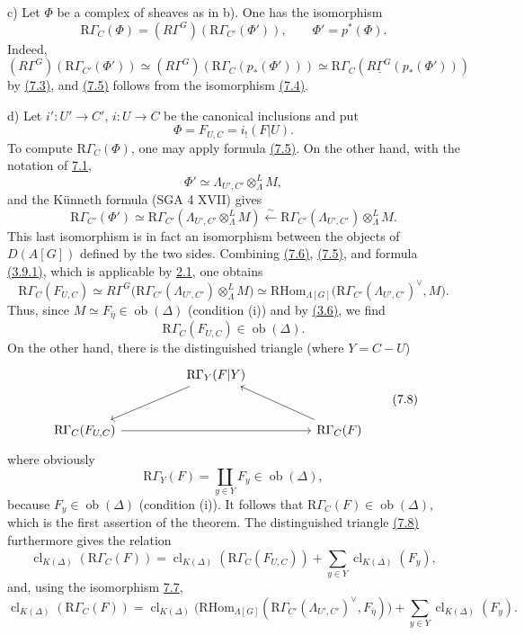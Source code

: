 \documentclass[11pt]{article}
\providecommand{\RHom}{\mathrm{RHom}}
\providecommand{\Ob}{\operatorname{ob}}
\providecommand{\RHom}{\mathrm{RHom}}
\providecommand{\RHom}{\mathrm R\mathcal{H}om}
\providecommand{\Ob}{\operatorname{ob}}
\providecommand{\Ob}{\operatorname{Ob}}
\providecommand{\clK}[1]{\operatorname{cl}_{K(#1)}}
\providecommand{\RG}{\mathrm R\Gamma}
\providecommand{\RHom}{\mathrm{RHom}}
\providecommand{\Ob}{\operatorname{ob}}
\providecommand{\Ob}{\operatorname{Ob}}
\begin{document}
c) Let $\Phi$ be a complex of sheaves as in b). One has the isomorphism
\[
\RG_C(\Phi)=(R\Gamma^G)(\RG_{C'}(\Phi')),
\qquad \Phi'=p^*(\Phi).
\tag{7.5}\label{sga5:X:equation:7.5}
\]
Indeed,
\[
(R\Gamma^G)(\RG_{C'}(\Phi'))
\simeq
(R\Gamma^G)(\RG_C(p_*(\Phi')))
\simeq
\RG_C(R\underline{\Gamma}^G(p_*(\Phi')))
\]
by \hyperref[sga5:X:equation:7.3]{(7.3)}, and \hyperref[sga5:X:equation:7.5]{(7.5)} follows from the isomorphism \hyperref[sga5:X:equation:7.4]{(7.4)}.

d) Let $i':U'\to C'$, $i:U\to C$ be the canonical inclusions and put
\[
\Phi=F_{U,C}=i_!(F|U).
\]
To compute $\RG_C(\Phi)$, one may apply formula \hyperref[sga5:X:equation:7.5]{(7.5)}. On the other hand, with the notation of \hyperref[sga5:X:theorem:7.1]{7.1},
\[
\Phi'\simeq \Lambda_{U',C'}\otimes_\Lambda^L M,
\]
and the Künneth formula (SGA 4 XVII) gives
\[
\RG_{C'}(\Phi')
\simeq
\RG_{C'}(\Lambda_{U',C'}\otimes_\Lambda^L M)
\xleftarrow{\sim}
\RG_{C'}(\Lambda_{U',C'})\otimes_\Lambda^L M.
\tag{7.6}\label{sga5:X:equation:7.6}
\]
This last isomorphism is in fact an isomorphism between the objects of $D(A[G])$ defined by the two sides. Combining \hyperref[sga5:X:equation:7.6]{(7.6)}, \hyperref[sga5:X:equation:7.5]{(7.5)}, and formula \hyperref[sga5:X:equation:3.9.1]{(3.9.1)}, which is applicable by \hyperref[sga5:X:lemma:2.1]{2.1}, one obtains
\[
\RG_C(F_{U,C})
\simeq
R\Gamma^G\bigl(\RG_{C'}(\Lambda_{U',C'})\otimes_\Lambda^L M\bigr)
\simeq
\RHom_{\Lambda[G]}\bigl(\RG_{C'}(\Lambda_{U',C'})^\vee,M\bigr).
\tag{7.7}\label{sga5:X:equation:7.7}
\]
Thus, since $M\simeq F_{\bar\eta}\in\Ob(\Delta)$ (condition (i)) and by \hyperref[sga5:X:proposition:3.6]{(3.6)}, we find
\[
\RG_C(F_{U,C})\in\Ob(\Delta).
\]
On the other hand, there is the distinguished triangle (where $Y=C-U$)
\[
\begin{tikzcd}[column sep=huge,row sep=large]
& \RG_Y(F|Y) \arrow[dl] & \\
\RG_C(F_{U,C}) \arrow[rr] && \RG_C(F) \arrow[ul]
\end{tikzcd}
\tag{7.8}\label{sga5:X:equation:7.8}
\]
where obviously
\[
\RG_Y(F)=\coprod_{y\in Y}F_y\in\Ob(\Delta),
\]
because $F_y\in\Ob(\Delta)$ (condition (i)). It follows that $\RG_C(F)\in\Ob(\Delta)$, which is the first assertion of the theorem. The distinguished triangle \hyperref[sga5:X:equation:7.8]{(7.8)} furthermore gives the relation
\[
\clK{\Delta}(\RG_C(F))
=
\clK{\Delta}(\RG_C(F_{U,C}))
+\sum_{y\in Y}\clK{\Delta}(F_y),
\]
and, using the isomorphism \hyperref[sga5:X:equation:7.7]{7.7},
\[
\clK{\Delta}(\RG_C(F))
=
\clK{\Delta}\bigl(\RHom_{\Lambda[G]}(\RG_{C'}(\Lambda_{U',C'})^\vee,F_{\bar\eta})\bigr)
+\sum_{y\in Y}\clK{\Delta}(F_y).
\]
\end{document}
